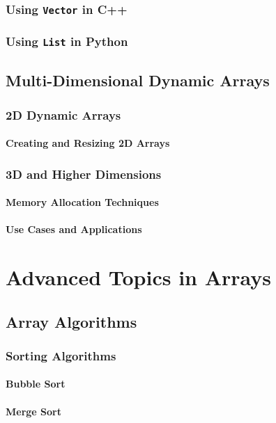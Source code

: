 \documentclass[12pt, oneside]{book}
\begin{document}
	\subsection{Using \texttt{Vector} in C++}
	\subsection{Using \texttt{List} in Python}
	
	\section{Multi-Dimensional Dynamic Arrays}
	\subsection{2D Dynamic Arrays}
	\subsubsection{Creating and Resizing 2D Arrays}
	\subsection{3D and Higher Dimensions}
	\subsubsection{Memory Allocation Techniques}
	\subsubsection{Use Cases and Applications}
	
\chapter{Advanced Topics in Arrays}

	\section{Array Algorithms}
	\subsection{Sorting Algorithms}
	\subsubsection{Bubble Sort}
	\subsubsection{Merge Sort}
\end{document}
